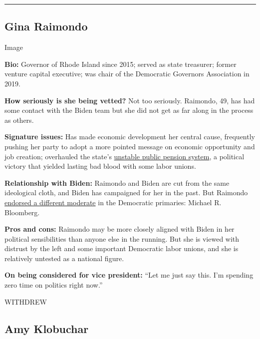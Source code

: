 \begin{center}\rule{0.5\linewidth}{\linethickness}\end{center}

\hypertarget{gina-raimondo}{%
\subsection{Gina Raimondo}\label{gina-raimondo}}

Image

\textbf{Bio:} Governor of Rhode Island since 2015; served as state
treasurer; former venture capital executive; was chair of the Democratic
Governors Association in 2019.

\textbf{How seriously is she being vetted?} Not too seriously. Raimondo,
49, has had some contact with the Biden team but she did not get as far
along in the process as others.

\textbf{Signature issues:} Has made economic development her central
cause, frequently pushing her party to adopt a more pointed message on
economic opportunity and job creation; overhauled the state's
\href{https://www.nytimes3xbfgragh.onion/2015/09/26/business/dealbook/rhode-island-averts-pension-disaster-without-raising-taxes.html}{unstable
public pension system}, a political victory that yielded lasting bad
blood with some labor unions.

\textbf{Relationship with Biden:} Raimondo and Biden are cut from the
same ideological cloth, and Biden has campaigned for her in the past.
But Raimondo
\href{https://www.nytimes3xbfgragh.onion/2019/11/24/us/politics/michael-bloomberg-2020-presidency.html}{endorsed
a different moderate} in the Democratic primaries: Michael R. Bloomberg.

\textbf{Pros and cons:} Raimondo may be more closely aligned with Biden
in her political sensibilities than anyone else in the running. But she
is viewed with distrust by the left and some important Democratic labor
unions, and she is relatively untested as a national figure.

\textbf{On being considered for vice president:} ``Let me just say this.
I'm spending zero time on politics right now.''

WITHDREW

\hypertarget{amy-klobuchar}{%
\subsection{Amy Klobuchar}\label{amy-klobuchar}}


